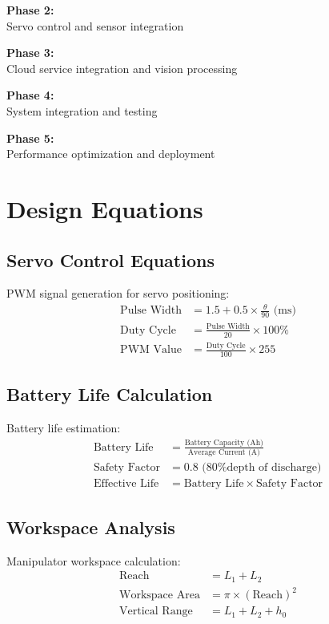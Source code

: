 \textbf{Phase 2:}
\\Servo control and sensor integration

\textbf{Phase 3:}
\\Cloud service integration and vision processing

\textbf{Phase 4:}
\\System integration and testing

\textbf{Phase 5:}
\\Performance optimization and deployment

\section{Design Equations}

\subsection{Servo Control Equations}
PWM signal generation for servo positioning:
\begin{align}
\text{Pulse Width} &= 1.5 + 0.5 \times \frac{\theta}{90} \text{ (ms)} \\
\text{Duty Cycle} &= \frac{\text{Pulse Width}}{20} \times 100\% \\
\text{PWM Value} &= \frac{\text{Duty Cycle}}{100} \times 255
\end{align}

\subsection{Battery Life Calculation}
Battery life estimation:
\begin{align}
\text{Battery Life} &= \frac{\text{Battery Capacity (Ah)}}{\text{Average Current (A)}} \\
\text{Safety Factor} &= 0.8 \text{ (80\% depth of discharge)} \\
\text{Effective Life} &= \text{Battery Life} \times \text{Safety Factor}
\end{align}

\subsection{Workspace Analysis}
Manipulator workspace calculation:
\begin{align}
\text{Reach} &= L_1 + L_2 \\
\text{Workspace Area} &= \pi \times (\text{Reach})^2 \\
\text{Vertical Range} &= L_1 + L_2 + h_0
\end{align}

